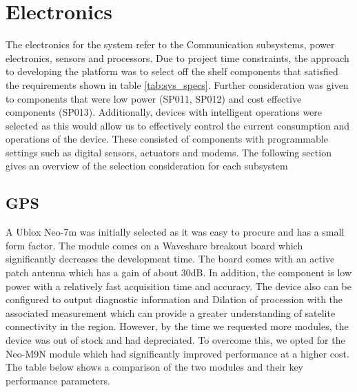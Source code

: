 \section{Electronics}

The electronics for the system refer to the Communication subsystems, power electronics, sensors and processors. Due to project time constraints, the approach to developing the platform was to select off the shelf components that satisfied the requirements shown in table \ref{tab:sys_specs}. Further consideration was given to components that were low power (SP011, SP012) and cost effective components (SP013). Additionally, devices with intelligent operations were selected as this would allow us to effectively control the current consumption and operations of the device. These consisted of components with programmable settings such as digital sensors, actuators and modems. The following section gives an overview of the selection consideration for each subsystem

\subsection{GPS}

A Ublox Neo-7m was initially selected as it was easy to procure and has a small form factor. The module comes on a Waveshare breakout board which significantly decreases the development time. The board comes with an active patch antenna which has a gain of about 30dB. In addition, the component is low power with a relatively fast acquisition time and accuracy. The device also can be configured to output diagnostic information and Dilation of procession with the associated measurement which can provide a greater understanding of satelite connectivity in the region. However, by the time we requested more modules, the device was out of stock and had depreciated. To overcome this, we opted for the Neo-M9N module which had significantly improved performance at a higher cost. The table below shows a comparison of the two modules and their key performance parameters.

